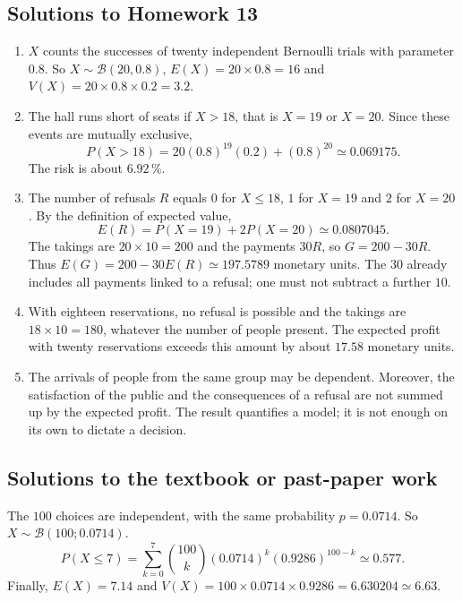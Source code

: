 \subsection{Solutions to Homework 13}\begin{enumerate}
\item $X$ counts the successes of twenty independent Bernoulli trials with parameter $0.8$. So $X\sim\mathcal B(20,0.8)$, $E(X)=20\times0.8=16$ and $V(X)=20\times0.8\times0.2=3.2$.
\item The hall runs short of seats if $X>18$, that is $X=19$ or $X=20$. Since these events are mutually exclusive,
\[P(X>18)=20(0.8)^{19}(0.2)+(0.8)^{20}\simeq0.069175.\]
The risk is about $6.92\,\%$.
\item The number of refusals $R$ equals $0$ for $X\le18$, $1$ for $X=19$ and $2$ for $X=20$. By the definition of expected value,
\[E(R)=P(X=19)+2P(X=20)\simeq0.0807045.\]
The takings are $20\times10=200$ and the payments $30R$, so $G=200-30R$. Thus $E(G)=200-30E(R)\simeq197.5789$ monetary units. The $30$ already includes all payments linked to a refusal; one must not subtract a further $10$.
\item With eighteen reservations, no refusal is possible and the takings are $18\times10=180$, whatever the number of people present. The expected profit with twenty reservations exceeds this amount by about $17.58$ monetary units.
\item The arrivals of people from the same group may be dependent. Moreover, the satisfaction of the public and the consequences of a refusal are not summed up by the expected profit. The result quantifies a model; it is not enough on its own to dictate a decision.
\end{enumerate}

\subsection{Solutions to the textbook or past-paper work}The $100$ choices are independent, with the same probability $p=0.0714$. So $X\sim\mathcal B(100;0.0714)$.
\[P(X\le7)=\sum_{k=0}^7\binom{100}k(0.0714)^k(0.9286)^{100-k}\simeq0.577.\]
Finally, $E(X)=7.14$ and $V(X)=100\times0.0714\times0.9286=6.630204\simeq6.63$.

\fi

